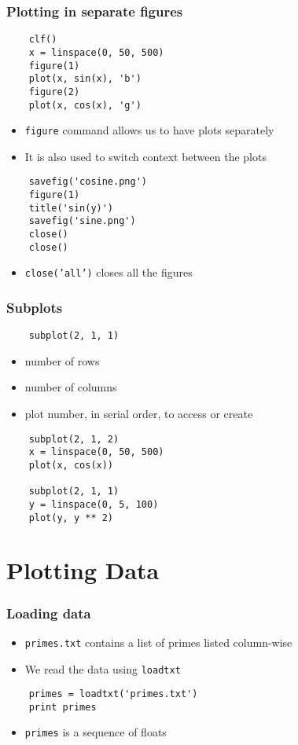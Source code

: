 \begin{frame}[fragile]
  \frametitle{Plotting in separate figures}
  \begin{lstlisting}
    clf()
    x = linspace(0, 50, 500)
    figure(1)
    plot(x, sin(x), 'b')
    figure(2)
    plot(x, cos(x), 'g')
  \end{lstlisting}
  \begin{itemize}
  \item \texttt{figure} command allows us to have plots separately
  \item It is also used to switch context between the plots
  \end{itemize}
  \begin{lstlisting}
    savefig('cosine.png')
    figure(1)
    title('sin(y)')
    savefig('sine.png')
    close()
    close()
  \end{lstlisting}
  \begin{itemize}
  \item \texttt{close('all')} closes all the figures
  \end{itemize}
\end{frame}

\begin{frame}[fragile]
  \frametitle{Subplots}
  \begin{lstlisting}
    subplot(2, 1, 1)
  \end{lstlisting}
  \begin{itemize}
  \item number of rows
  \item number of columns
  \item plot number, in serial order, to access or create
  \end{itemize}
  \begin{lstlisting}
    subplot(2, 1, 2)
    x = linspace(0, 50, 500)
    plot(x, cos(x))

    subplot(2, 1, 1)
    y = linspace(0, 5, 100)
    plot(y, y ** 2)
  \end{lstlisting}
\end{frame}

\section{Plotting Data}

\begin{frame}[fragile]
  \frametitle{Loading data}
  \begin{itemize}
  \item \texttt{primes.txt} contains a list of primes listed
    column-wise
  \item We read the data using \texttt{loadtxt} 
  \end{itemize}
  \begin{lstlisting}
    primes = loadtxt('primes.txt')
    print primes
  \end{lstlisting}
  \begin{itemize}
  \item \texttt{primes} is a sequence of floats
  \end{itemize}
\end{frame}

